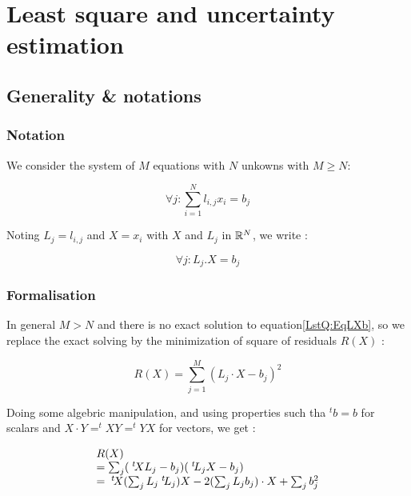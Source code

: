\chapter{Least square and uncertainty estimation}
\label{Chap:LeastSquare}


\section{Generality \& notations}

\subsection{Notation}

We consider the system of $M$ equations with $N$ unkowns with $M\geq N$:

\begin{equation}
	\forall j : \sum_{i=1}^N l_{i,j} x_i = b_j
\end{equation}

Noting $L_j =  l_{i,j}$ and $X=x_i$ with $X$ and $L_j$ in $\mathbb{R}^N$, we write :

\begin{equation}
	\forall j :  L_j . X = b_j \label{LstQ:EqLXb}
\end{equation}

\subsection{Formalisation}

In general $M>N$ and there is no exact solution to equation\ref{LstQ:EqLXb},
so we replace the exact solving by the minimization of square of residuals $R(X)$ :


\begin{equation}
	R(X)  =  \sum_{j=1}^M (L_j \cdot X - b_j)^2
\end{equation}

Doing some algebric manipulation, and using properties such tha $^t b= b$ for scalars and $X \cdot Y= ^t X Y = ^t Y X$ for vectors, we get :

\begin{equation}
\begin{array}{l}
	R(X)  \\
         =  \sum_j  (\; ^{t} \! X L_j -b_j)  ( \; ^{t} \! L_j  X -b_j) \\
	 = \; ^{t} \! X  (\sum_j L_j  \; ^{t} \! L_j) X - 2 (\sum_j L_j b_j) \cdot X + \sum_j b_j ^2
\end{array}
\end{equation}

